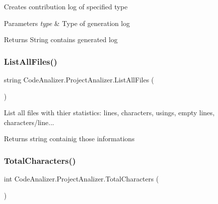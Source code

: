 Creates contribution log of specified type 


\begin{DoxyParams}{Parameters}
{\em type} & Type of generation log\\
\hline
\end{DoxyParams}
\begin{DoxyReturn}{Returns}
String contains generated log
\end{DoxyReturn}
\mbox{\label{class_code_analizer_1_1_project_analizer_acf4aae301520f5a14168668007c39cf6}} 
\subsubsection{\texorpdfstring{List\+All\+Files()}{ListAllFiles()}}
{\footnotesize\ttfamily string Code\+Analizer.\+Project\+Analizer.\+List\+All\+Files (\begin{DoxyParamCaption}{ }\end{DoxyParamCaption})}



List all files with thier statistics\+: lines, characters, usings, empty lines, characters/line... 

\begin{DoxyReturn}{Returns}
string containig those informations
\end{DoxyReturn}
\mbox{\label{class_code_analizer_1_1_project_analizer_a8e4045d90ae317a8172e3ee5236fb0f6}} 
\subsubsection{\texorpdfstring{Total\+Characters()}{TotalCharacters()}}
{\footnotesize\ttfamily int Code\+Analizer.\+Project\+Analizer.\+Total\+Characters (\begin{DoxyParamCaption}{ }\end{DoxyParamCaption})}



